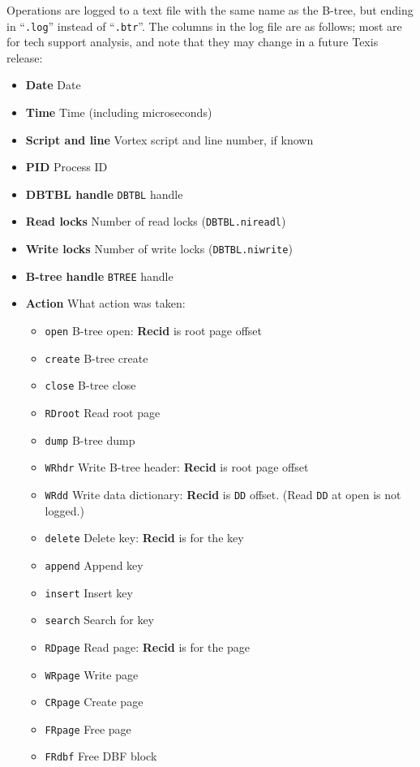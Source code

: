\begin{description}
  Operations are logged to a text file with the same name as the
B-tree, but ending in ``\verb`.log`'' instead of ``\verb`.btr`''.
The columns in the log file are as follows; most are for tech
support analysis, and note that they may change in a future Texis release:
\begin{itemize}
  \item {\bf Date} Date
  \item {\bf Time} Time (including microseconds)
  \item {\bf Script and line} Vortex script and line number, if known
  \item {\bf PID} Process ID
  \item {\bf DBTBL handle} \verb`DBTBL` handle
  \item {\bf Read locks} Number of read locks (\verb`DBTBL.nireadl`)
  \item {\bf Write locks} Number of write locks (\verb`DBTBL.niwrite`)
  \item {\bf B-tree handle} \verb`BTREE` handle
  \item {\bf Action} What action was taken:
    \begin{itemize}
      \item \verb`open` B-tree open: {\bf Recid} is root page offset
      \item \verb`create` B-tree create
      \item \verb`close` B-tree close
      \item \verb`RDroot` Read root page
      \item \verb`dump` B-tree dump
      \item \verb`WRhdr` Write B-tree header: {\bf Recid} is root page offset
      \item \verb`WRdd` Write data dictionary: {\bf Recid} is \verb`DD` offset.
                       (Read \verb`DD` at open is not logged.)
      \item \verb`delete` Delete key: {\bf Recid} is for the key
      \item \verb`append` Append key
      \item \verb`insert` Insert key
      \item \verb`search` Search for key
      \item \verb`RDpage` Read page: {\bf Recid} is for the page
      \item \verb`WRpage` Write page
      \item \verb`CRpage` Create page
      \item \verb`FRpage` Free page
      \item \verb`FRdbf` Free DBF block

\end{itemize}
\end{itemize}
\end{description}
